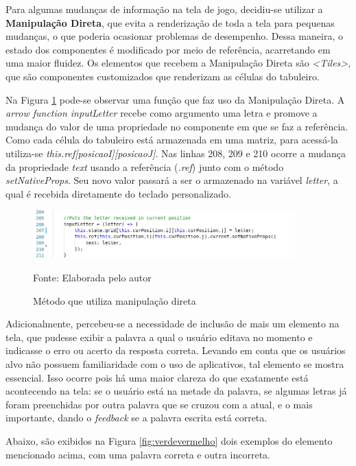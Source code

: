 Para algumas mudanças de informação na tela de jogo, decidiu-se utilizar a \textbf{Manipulação Direta}, que evita a renderização de toda a tela para pequenas mudanças, o que poderia ocasionar problemas de desempenho. Dessa maneira, o estado dos componentes é modificado por meio de referência, acarretando em uma maior fluidez. Os elementos que recebem a Manipulação Direta são \textit{<Tiles>}, que são componentes customizados que renderizam as células do tabuleiro. 

Na Figura \ref{fig:codeDirectManipulation} pode-se observar uma função que faz uso da Manipulação Direta. A \textit{arrow function inputLetter} recebe como argumento uma letra e promove a mudança do valor de uma propriedade no componente em que se faz a referência. Como cada célula do tabuleiro está armazenada em uma matriz, para acessá-la utiliza-se \textit{this.ref[posicaoI][posicaoJ]}. Nas linhas 208, 209 e 210 ocorre a mudança da propriedade \textit{text} usando a referência (\textit{.ref}) junto com o método \textit{setNativeProps}. Seu novo valor passará a ser o armazenado na variável \textit{letter}, a qual é recebida diretamente do teclado personalizado.

\begin{figure}[H]
\centering
    \caption{Método que utiliza manipulação direta}
    \label{fig:codeDirectManipulation}
    \includegraphics[width=0.9\textwidth]{Figuras/codeDirectManipulation.png}
    
    Fonte: Elaborada pelo autor
\end{figure}

Adicionalmente, percebeu-se a necessidade de inclusão de mais um elemento na tela, que pudesse exibir a palavra a qual o usuário editava no momento e indicasse o erro ou acerto da resposta correta.
Levando em conta que os usuários alvo não possuem familiaridade com o uso de aplicativos, tal elemento se mostra essencial. Isso ocorre pois há uma maior clareza do que exatamente está acontecendo na tela: se o usuário está na metade da palavra, se algumas letras já foram preenchidas por outra palavra que se cruzou com a atual, e o mais importante, dando o \textit{feedback} se a palavra escrita está correta.

Abaixo, são exibidos na Figura \ref{fig:verdevermelho} dois exemplos do elemento mencionado acima, com uma palavra correta e outra incorreta.

